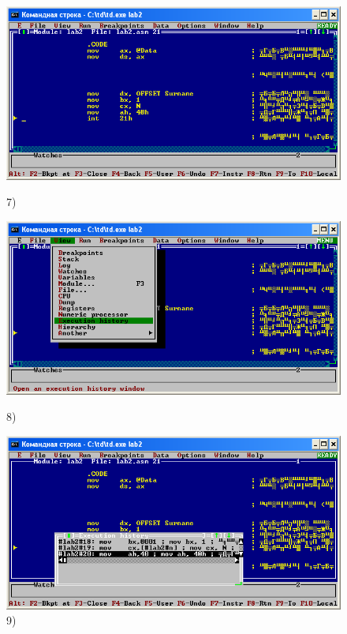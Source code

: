 \begin{figure}[!htp]
    \centering
    \begin{minipage}{0.32\textwidth}
        \centering
        \includegraphics[width=.99\linewidth]
            {../_INCLUDES/task-4-17-2/7.png}
        \caption{7) }
        \label{fig:task_4_17_2__7}
    \end{minipage}
    \begin {minipage}{0.32\textwidth}
        \centering
        \includegraphics[width=.99\linewidth]
            {../_INCLUDES/task-4-17-2/8.png}
        \caption{8) }
        \label{fig:task_4_17_2__8}
    \end{minipage}
    \begin {minipage}{0.32\textwidth}
        \centering
        \includegraphics[width=.99\linewidth]
            {../_INCLUDES/task-4-17-2/9.png}
        \caption{9) }
        \label{fig:task_4_17_2__9}
    \end{minipage}
\end{figure}

